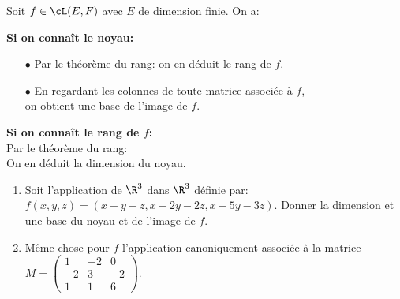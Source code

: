 \documentclass[a4paper, 11pt]{article}
\begin{document}
\begin{prop} Soit $f\in\cL(E,F)$ avec $E$ de dimension finie. On a:
\vspace{1cm}
\end{prop}



\vspace{0.4cm}




\begin{dboxminipage}{0.7\textwidth}
\textbf{Si on conna\^{i}t le noyau:}
\begin{itemize}
\item[$\bullet$] Par le th\'eor\`{e}me du rang: on en d\'eduit le rang de $f$.
\item[$\bullet$] En regardant les colonnes de toute matrice associ\'ee \`{a} $f$,\\
on obtient une base de l'image de $f$.
\end{itemize}
\vsec
\textbf{Si on conna\^{i}t le rang de $f$:}\\
Par le th\'eor\`{e}me du rang:\\
On en d\'eduit la dimension du noyau.
\end{dboxminipage}


 

 

{\footnotesize \begin{exercice}
\begin{enumerate}
\item Soit l'application de $\R^3$ dans $\R^3$ d\'efinie par: $f(x,y,z)=(x+y-z, x-2y-2z, x-5y-3z)$. Donner la dimension et une base du noyau et de l'image de $f$.
\item M\^eme chose pour $f$ l'application canoniquement associ\'ee \`a la matrice $M=\left(\begin{array}{rrr} 1&-2&0\\-2&3&-2\\1&1&6  \end{array}\right)$.
\end{enumerate}
\end{exercice}
}

% 
\end{document}
